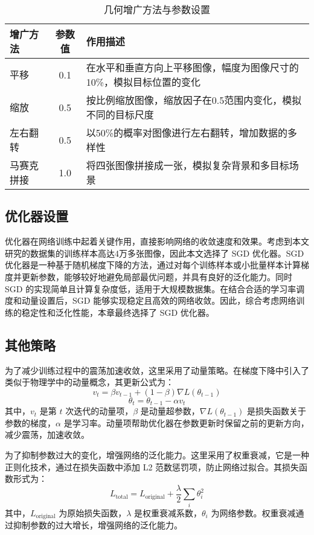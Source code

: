 \begin{table}[htbp]
	\centering
	\caption{几何增广方法与参数设置}
	\label{tab:geometric_augmentation}
	\begin{tabular}{lcp{8cm}}
		\toprule[1.5pt]
		增广方法 & 参数值 & 作用描述 \\
		\midrule[1pt]
		平移 & 0.1 & 在水平和垂直方向上平移图像，幅度为图像尺寸的10\%，模拟目标位置的变化 \\
		缩放 & 0.5 & 按比例缩放图像，缩放因子在0.5范围内变化，模拟不同的目标尺度 \\
		左右翻转 & 0.5 & 以50\%的概率对图像进行左右翻转，增加数据的多样性 \\
		马赛克拼接 & 1.0 & 将四张图像拼接成一张，模拟复杂背景和多目标场景 \\
		\bottomrule[1.5pt]
	\end{tabular}
\end{table}

\subsection{优化器设置}
优化器在网络训练中起着关键作用，直接影响网络的收敛速度和效果。考虑到本文研究的数据集的训练样本高达4万多张图像，因此本文选择了 SGD 优化器。SGD 优化器是一种基于随机梯度下降的方法，通过对每个训练样本或小批量样本计算梯度并更新参数，能够较好地避免局部最优问题，并具有良好的泛化能力。同时SGD 的实现简单且计算复杂度低，适用于大规模数据集。在结合合适的学习率调度和动量设置后，SGD 能够实现稳定且高效的网络收敛。因此，综合考虑网络训练的稳定性和泛化性能，本章最终选择了 SGD 优化器。 

\subsection{其他策略}

为了减少训练过程中的震荡加速收敛，这里采用了动量策略。在梯度下降中引入了类似于物理学中的动量概念，其更新公式为：
\begin{equation}
	v_t = \beta v_{t-1} + (1 - \beta) \nabla L(\theta_{t-1})
\end{equation}
\begin{equation}
	\theta_t = \theta_{t-1} - \alpha v_t
\end{equation}
其中，\(v_t\) 是第 \(t\) 次迭代的动量项，\(\beta\) 是动量超参数，\(\nabla L(\theta_{t-1})\) 是损失函数关于参数的梯度，\(\alpha\) 是学习率。动量项帮助优化器在参数更新时保留之前的更新方向，减少震荡，加速收敛。


为了抑制参数过大的变化，增强网络的泛化能力。这里采用了权重衰减，它是一种正则化技术，通过在损失函数中添加 L2 范数惩罚项，防止网络过拟合。其损失函数形式为：
\begin{equation}
	L_{\text{total}} = L_{\text{original}} + \frac{\lambda}{2} \sum_{i} \theta_i^2
\end{equation}
其中，\(L_{\text{original}}\) 为原始损失函数，\(\lambda\) 是权重衰减系数，\(\theta_i\) 为网络参数。权重衰减通过抑制参数的过大增长，增强网络的泛化能力。

